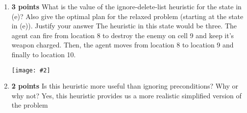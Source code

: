 \documentclass{article}
\def\ans#1{{\color{ans}#1}}
\newcommand{\centerfig}[2]{\begin{center}\texttt{[image: \#2]}\end{center}}
\begin{document}
\begin{enumerate}[label=(\alph*)]
     \ans{
         The heuristic in this state would be one. The agent just has to move to location 10 from 
         location 9 to reach the goal state.
    } \\
    \centerfig{0.3}{../figs/1-h.png}
	\item \textbf{3 points} What is the value of the ignore-delete-list heuristic for the state in (e)? Also give the optimal plan for the relaxed problem (starting at the state in (e)). Justify your answer
        \ans{
       The heuristic in this state would be three. The agent can fire from location 8 to destroy the 
       enemy on cell 9 and keep it's weapon charged. Then, the agent moves from location 8 to location 
       9 and finally to location 10.
    } \\
    \centerfig{0.4}{../figs/1-i.png}
	\item \textbf{2 points} Is this heuristic more useful than ignoring preconditions? Why or why not? 
     \ans{
        Yes, this heuristic provides us a more realistic simplified version of the problem 
    }  \\
    
\end{enumerate}

\clearpage
\end{document}
